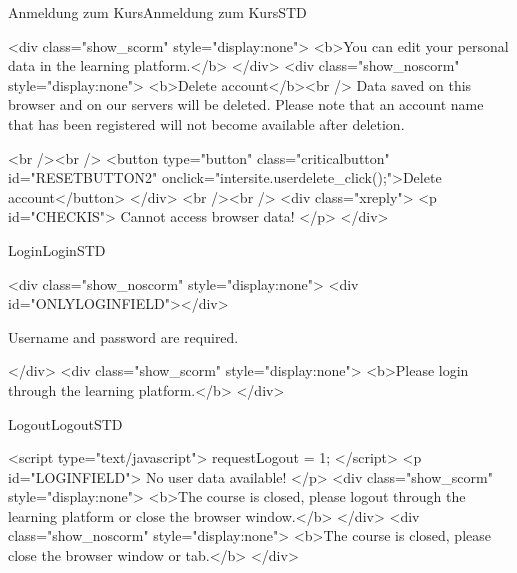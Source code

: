 \begin{MXContent}{Anmeldung zum Kurs}{Anmeldung zum Kurs}{STD}




\begin{html}
<div class="show_scorm" style="display:none">
<b>You can edit your personal data in the learning platform.</b>
</div>
<div class="show_noscorm" style="display:none">
<b>Delete account</b><br />
Data saved on this browser and on our servers will be deleted. Please note that
an account name that has been registered will not become available after
deletion.

<br /><br />
<button type="button" class="criticalbutton" id="RESETBUTTON2"
onclick="intersite.userdelete_click();">Delete account</button> </div>
<br /><br />
<div class="xreply">
<p id="CHECKIS">
Cannot access browser data!
</p>
</div>
\end{html}
\end{MXContent}

\begin{MXContent}{Login}{Login}{STD}
\MGlobalLoginTag
{}
\begin{html}
<div class="show_noscorm" style="display:none">
<div id="ONLYLOGINFIELD"></div>
\end{html}

Username and password are required.

\begin{html}
</div>
<div class="show_scorm" style="display:none">
<b>Please login through the learning platform.</b>
</div>
\end{html}

\end{MXContent}


\begin{MXContent}{Logout}{Logout}{STD}
\MGlobalLogoutTag
{}

\begin{html}
<script type="text/javascript">
requestLogout = 1;
</script>
<p id="LOGINFIELD">
No user data available!
</p>
<div class="show_scorm" style="display:none">
<b>The course is closed, please logout through the learning platform or
close the browser window.</b> </div>
<div class="show_noscorm" style="display:none">
<b>The course is closed, please close the browser window or tab.</b>
</div>
\end{html}

\end{MXContent}


